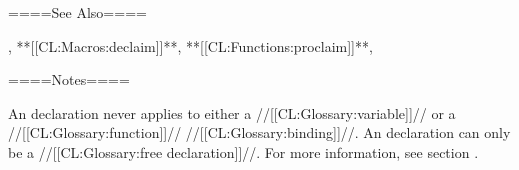 ====See Also====

, **[[CL:Macros:declaim]]**, **[[CL:Functions:proclaim]]**, {\secref\DeclScope}

====Notes====

An  declaration never applies to either a //[[CL:Glossary:variable]]// or a //[[CL:Glossary:function]]// //[[CL:Glossary:binding]]//. An  declaration can only be a //[[CL:Glossary:free declaration]]//. For more information, see section {\secref\DeclScope}.

